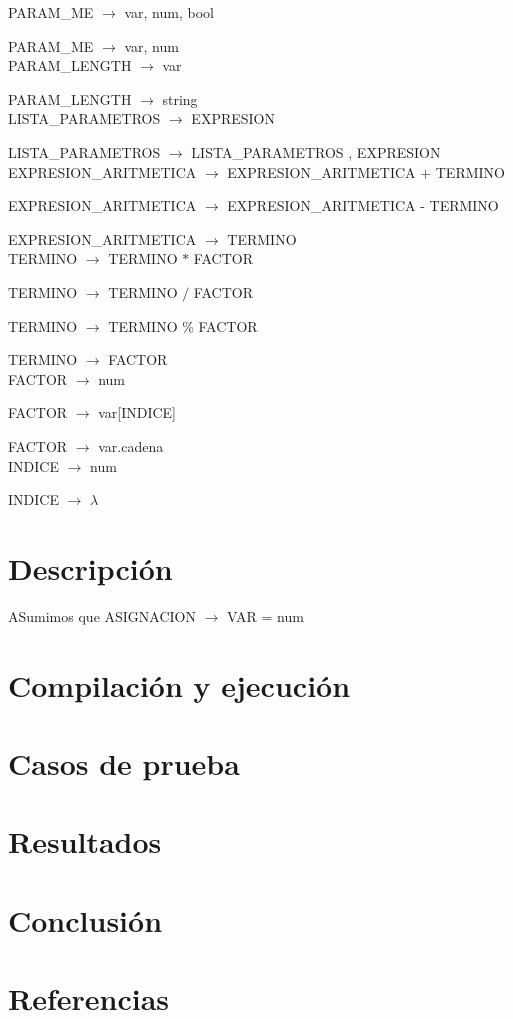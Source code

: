 \documentclass[10pt,a4paper]{article}
\begin{document}
PARAM\_ME $\rightarrow$ var, num, bool   

PARAM\_ME $\rightarrow$ var, num \\

PARAM\_LENGTH $\rightarrow$ var    

PARAM\_LENGTH $\rightarrow$ string \\

LISTA\_PARAMETROS $\rightarrow$ EXPRESION   

LISTA\_PARAMETROS $\rightarrow$ LISTA\_PARAMETROS , EXPRESION \\

EXPRESION\_ARITMETICA $\rightarrow$ EXPRESION\_ARITMETICA + TERMINO   

EXPRESION\_ARITMETICA $\rightarrow$ EXPRESION\_ARITMETICA - TERMINO  

EXPRESION\_ARITMETICA $\rightarrow$ TERMINO \\

TERMINO $\rightarrow$ TERMINO $*$ FACTOR   

TERMINO $\rightarrow$ TERMINO $/$ FACTOR   

TERMINO $\rightarrow$ TERMINO \% FACTOR  

TERMINO $\rightarrow$ FACTOR \\

FACTOR $\rightarrow$ num   

FACTOR $\rightarrow$ var[INDICE]   

FACTOR $\rightarrow$ var.cadena  \\

INDICE $\rightarrow$ num 

INDICE $\rightarrow$ $\lambda$ \\





\section{Descripción}

ASumimos que ASIGNACION $\rightarrow$ VAR = num 


\section{Compilación y ejecución}

\section{Casos de prueba}

\section{Resultados}

\section{Conclusión}

\section{Referencias}
\end{document}
